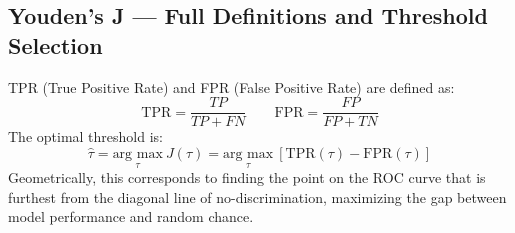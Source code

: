 \documentclass{article}
\begin{document}
\subsection*{Youden's J --- Full Definitions and Threshold Selection}
TPR (True Positive Rate) and FPR (False Positive Rate) are defined as:
\begin{equation}
\text{TPR} = \frac{TP}{TP + FN} \qquad \text{FPR} = \frac{FP}{FP + TN}
\end{equation}
The optimal threshold is:
\begin{equation}
\hat{\tau} = \underset{\tau}{\text{arg max}} \ J(\tau) = \underset{\tau}{\text{arg max}} \ [\text{TPR}(\tau) - \text{FPR}(\tau)]
\end{equation}
Geometrically, this corresponds to finding the point on the ROC curve that is furthest from the diagonal line of no-discrimination, maximizing the gap between model performance and random chance.



\end{document}
